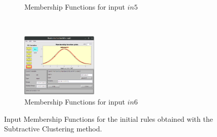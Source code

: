 \documentclass[11pt]{article}
\begin{document}
\begin{figure}[ht]
\begin{subfigure}[t]{0.3\textwidth}
		\caption{Membership Functions for input $in5$}
	\end{subfigure}
	~
	\begin{subfigure}[t]{0.3\textwidth}
		\centering
		\includegraphics[height=1.2in]{images/subtractive_in6}
		\caption{Membership Functions for input $in6$}
	\end{subfigure}
	\caption{Input Membership Functions for the initial rules obtained with the Subtractive Clustering method.}
\end{figure}

\end{document}
